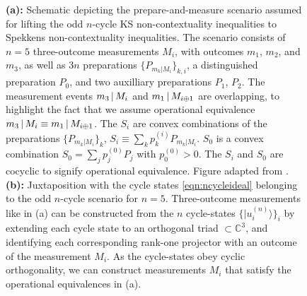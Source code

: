 \begin{figure}
    \caption{\textbf{(a):} Schematic depicting the prepare-and-measure scenario assumed for lifting the odd $n$-cycle KS non-contextuality inequalities to Spekkens non-contextuality inequalities. The scenario consists of $n=5$ three-outcome measurements $M_i$, with outcomes $m_1$, $m_2$, and $m_3$, as well as $3n$ preparations $\{P_{m_k\vert M_i}\}_{k,i}$, a distinguished preparation $P_0$, and two auxilliary preparations $P_1$, $P_2$. The measurement events $m_3\thinspace\vert\thinspace M_i$ and $m_1\thinspace\vert\thinspace M_{i\oplus 1}$ are overlapping, to highlight the fact that we assume operational equivalence $m_3\thinspace\vert\thinspace M_i\equiv m_1\thinspace\vert\thinspace M_{i\oplus 1}$. The $S_i$ are convex combinations of the preparations $\{P_{m_k\vert M_i}\}_k$, $S_i\equiv \sum_k p_k^{(i)}P_{m_k\vert M_i}$. $S_0$ is a convex combination $S_0=\sum_j p_j^{(0)}P_j$ with $p_0^{(0)}>0$. The $S_i$ and $S_0$ are cocyclic to signify operational equivalence. Figure adapted from \cite{Kunjwal2019}. \textbf{(b):} Juxtaposition with the cycle states \ref{eqn:ncycleideal} belonging to the odd $n$-cycle scenario for $n=5$. Three-outcome measurements like in (a) can be constructed from the $n$ cycle-states $\{\vert u_i^{(n)}\rangle\}_i$ by extending each cycle state to an orthogonal triad $\subset \mathbb{C}^3$, and identifying each corresponding rank-one projector with an outcome of the measurement $M_i$. As the cycle-states obey cyclic orthogonality, we can construct measurements $M_i$ that satisfy the operational equivalences in (a).}
\label{fig:kcbsspekkens}
\end{figure}

